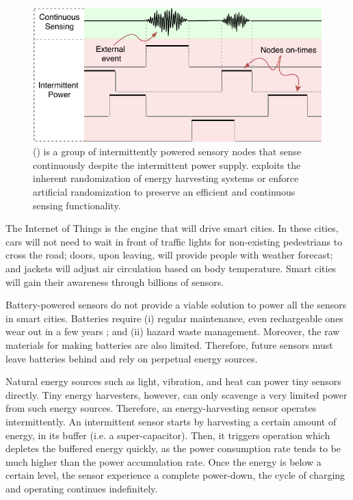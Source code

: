 \begin{figure}
	\centering
	\includegraphics[width=\columnwidth]{figures/coalInterSen}
	\caption{\fullsys (\sys) is a group of intermittently powered sensory nodes that sense continuously despite the intermittent power supply. \sys exploits the inherent randomization of energy harvesting systems or enforce artificial randomization to preserve an efficient and continuous sensing functionality.}
	\label{fig:powerCycle}
\end{figure}

The Internet of Things is the engine that will drive smart cities. In these cities, cars will not need to wait in front of traffic lights for non-existing pedestrians to cross the road; doors, upon leaving, will provide people with weather forecast; and jackets will adjust air circulation based on body temperature. Smart cities will gain their awareness through billions of sensors.

Battery-powered sensors do not provide a viable solution to power all the sensors in smart cities. Batteries require (i) regular maintenance, even rechargeable ones wear out in a few years \cite{xxx}; and (ii) hazard waste management. Moreover, the raw materials for making batteries are also limited. Therefore, future sensors must leave batteries behind and rely on perpetual energy sources. 

Natural energy sources such as light, vibration, and heat can power tiny sensors directly. Tiny energy harvesters, however, can only scavenge a very limited power from such energy sources. Therefore, an energy-harvesting sensor operates intermittently. An intermittent sensor starts by harvesting a certain amount of energy, in its buffer (i.e. a super-capacitor). Then, it triggers operation which depletes the buffered energy quickly, as the power consumption rate tends to be much higher than the power accumulation rate. Once the energy is below a certain level, the sensor experience a complete power-down, the cycle of charging and operating continues indefinitely.

